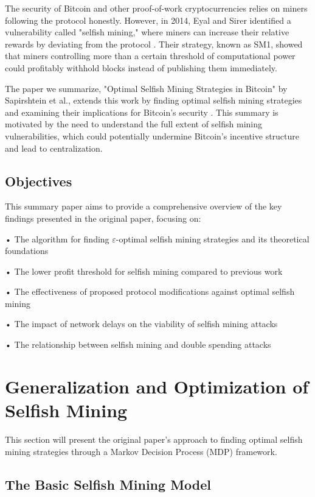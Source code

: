 \documentclass[conference]{IEEEtran}
\begin{document}
The security of Bitcoin and other proof-of-work cryptocurrencies relies on miners following the protocol honestly. 
However, in 2014, Eyal and Sirer identified a vulnerability called "selfish mining," 
where miners can increase their relative rewards by deviating from the protocol \cite{eyal2018majority}. 
Their strategy, known as SM1, showed that miners controlling more than a certain threshold of computational power 
could profitably withhold blocks instead of publishing them immediately.

The paper we summarize, "Optimal Selfish Mining Strategies in Bitcoin" by Sapirshtein et al., extends this work by finding optimal selfish mining strategies and examining their implications for Bitcoin's security \cite{sapirshtein2016optimal}. This summary is motivated by the need to understand the full extent of selfish mining vulnerabilities, which could potentially undermine Bitcoin's incentive structure and lead to centralization.

\subsection{Objectives}

This summary paper aims to provide a comprehensive overview of the key findings presented in the original paper, focusing on:

• The algorithm for finding $\varepsilon$-optimal selfish mining strategies and its theoretical foundations

• The lower profit threshold for selfish mining compared to previous work

• The effectiveness of proposed protocol modifications against optimal selfish mining

• The impact of network delays on the viability of selfish mining attacks

• The relationship between selfish mining and double spending attacks

\section{Generalization and Optimization of Selfish Mining}

This section will present the original paper's approach to finding optimal selfish mining strategies through a Markov Decision Process (MDP) framework.

\subsection{The Basic Selfish Mining Model}
\end{document}

